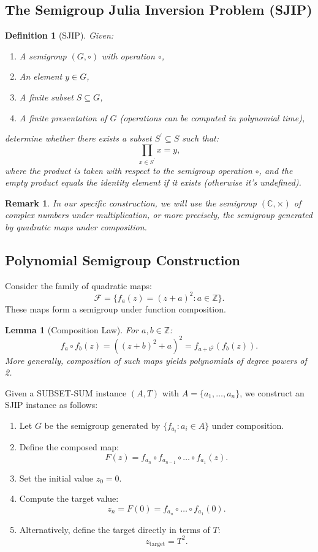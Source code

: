 \documentclass[12pt]{article}
\newtheorem{lemma}[theorem]{Lemma}
\newtheorem{definition}[theorem]{Definition}
\newtheorem{remark}[theorem]{Remark}
\newcommand{\C}{\mathbb{C}}
\newcommand{\Z}{\mathbb{Z}}
\begin{document}
\subsection{The Semigroup Julia Inversion Problem (SJIP)}
\begin{definition}[SJIP]
Given:
\begin{enumerate}
\item A semigroup $(G, \circ)$ with operation $\circ$,
\item An element $y \in G$,
\item A finite subset $S \subseteq G$,
\item A finite presentation of $G$ (operations can be computed in polynomial time),
\end{enumerate}
determine whether there exists a subset $S^{\prime} \subseteq S$ such that:
\[
\prod_{x\in S^{\prime}}x = y,
\]
where the product is taken with respect to the semigroup operation $\circ$, and the empty product equals the identity element if it exists (otherwise it's undefined).
\end{definition}

\begin{remark}
In our specific construction, we will use the semigroup $(\C, \times)$ of complex numbers under multiplication, or more precisely, the semigroup generated by quadratic maps under composition.
\end{remark}

\subsection{Polynomial Semigroup Construction}
Consider the family of quadratic maps:
\[
\mathcal{F} = \{f_{a}(z) = (z + a)^{2}:a\in \Z\}.
\]
These maps form a semigroup under function composition.

\begin{lemma}[Composition Law]
For $a, b \in \Z$:
\[
f_{a} \circ f_{b}(z) = ((z + b)^{2} + a)^{2} = f_{a + b^{2}}(f_{b}(z)).
\]
More generally, composition of such maps yields polynomials of degree powers of 2.
\end{lemma}

Given a SUBSET-SUM instance $(A, T)$ with $A = \{a_{1}, \ldots , a_{n}\}$, we construct an SJIP instance as follows:
\begin{enumerate}
\item Let $G$ be the semigroup generated by $\{f_{a_{i}}:a_{i}\in A\}$ under composition.
\item Define the composed map:
\[
F(z) = f_{a_{n}}\circ f_{a_{n - 1}}\circ \dots \circ f_{a_{1}}(z).
\]
\item Set the initial value $z_{0} = 0$.
\item Compute the target value:
\[
z_{n} = F(0) = f_{a_{n}}\circ \dots \circ f_{a_{1}}(0).
\]
\item Alternatively, define the target directly in terms of $T$:
\[
z_{\mathrm{target}} = T^{2}.
\]
\end{enumerate}
\end{document}

